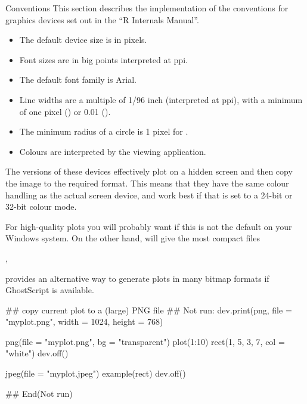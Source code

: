 \begin{Section}{Conventions}
This section describes the implementation of the conventions for
graphics devices set out in the ``R Internals Manual''.

\begin{itemize}

\item The default device size is in pixels.
\item Font sizes are in big points interpreted at  ppi.
\item The default font family is Arial.
\item Line widths are a multiple of 1/96 inch (interpreted at
 ppi), with a minimum of one pixel () or 0.01 ().
\item The minimum radius of a circle is 1 pixel for .
\item Colours are interpreted by the viewing application.

\end{itemize}

\end{Section}
%
\begin{Note}\relax
The  versions of these devices effectively
plot on a hidden screen and then copy the image to the required
format.  This means that they have the same colour handling as the
actual screen device, and work best if that is set to a 24-bit or
32-bit colour mode.

For high-quality plots you will probably want  if this is not the default on your Windows system.  On
the other hand,  will give the most
compact files
\end{Note}
%
\begin{SeeAlso}\relax
{}, 

 provides an alternative way to generate plots in
many bitmap formats if GhostScript is available.
\end{SeeAlso}
%
\begin{Examples}
\begin{ExampleCode}
## copy current plot to a (large) PNG file
## Not run: dev.print(png, file = "myplot.png", width = 1024, height = 768)

png(file = "myplot.png", bg = "transparent")
plot(1:10)
rect(1, 5, 3, 7, col = "white")
dev.off()

jpeg(file = "myplot.jpeg")
example(rect)
dev.off()

## End(Not run)
\end{ExampleCode}
\end{Examples}
